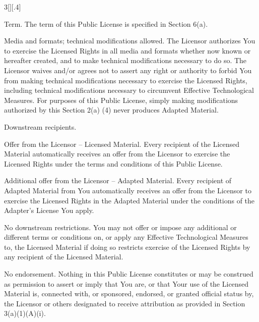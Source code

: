 \documentclass[8pt,cleardoubleempty]{scrbook}
\begin{document}
\begin{multicols}{3}[][.4\paperwidth]
\begin{longenum}
\begin{longenum}
\begin{longenum}
       \item Term. The term of this Public License is specified in Section
          6(a).

       \item Media and formats; technical modifications allowed. The
          Licensor authorizes You to exercise the Licensed Rights in
          all media and formats whether now known or hereafter created,
          and to make technical modifications necessary to do so. The
          Licensor waives and/or agrees not to assert any right or
          authority to forbid You from making technical modifications
          necessary to exercise the Licensed Rights, including
          technical modifications necessary to circumvent Effective
          Technological Measures. For purposes of this Public License,
          simply making modifications authorized by this Section 2(a)
          (4) never produces Adapted Material.

       \item Downstream recipients.

            \begin{longenum}

            \item Offer from the Licensor -- Licensed Material. Every
               recipient of the Licensed Material automatically
               receives an offer from the Licensor to exercise the
               Licensed Rights under the terms and conditions of this
               Public License.

            \item Additional offer from the Licensor -- Adapted Material.
               Every recipient of Adapted Material from You
               automatically receives an offer from the Licensor to
               exercise the Licensed Rights in the Adapted Material
               under the conditions of the Adapter's License You apply.

            \item No downstream restrictions. You may not offer or impose
               any additional or different terms or conditions on, or
               apply any Effective Technological Measures to, the
               Licensed Material if doing so restricts exercise of the
               Licensed Rights by any recipient of the Licensed
               Material.

            \end{longenum}

       \item No endorsement. Nothing in this Public License constitutes or
          may be construed as permission to assert or imply that You
          are, or that Your use of the Licensed Material is, connected
          with, or sponsored, endorsed, or granted official status by,
          the Licensor or others designated to receive attribution as
          provided in Section 3(a)(1)(A)(i).


\end{longenum}
\end{longenum}
\end{longenum}
\end{multicols}
\end{document}
